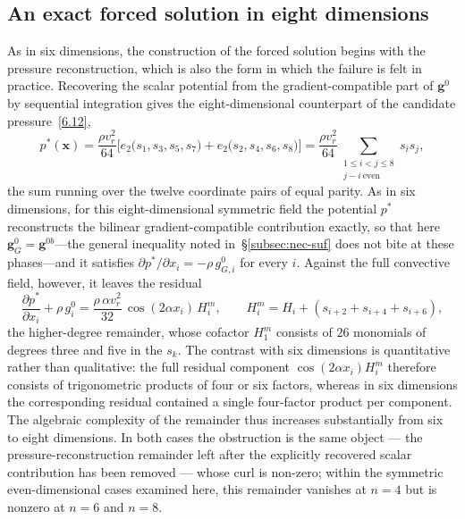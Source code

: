 \documentclass[11pt]{jfm}
\let\le=\leqslant  \let\leq=\leqslant
\numberwithin{equation}{section}
\begin{document}
\subsection{An exact forced solution in eight dimensions}
\label{subsec:8D-forced}
As in six dimensions, the construction of the forced solution begins with the pressure
reconstruction, which is also the form in which the failure is felt in practice. Recovering the scalar potential from the gradient-compatible
part of $\boldsymbol{g}^0$ by sequential integration gives the eight-dimensional counterpart of
the candidate pressure~\eqref{6.12},
\begin{equation}
\label{8.7}
p^{*}(\boldsymbol{x}) = \frac{\rho v_r^2}{64}
\Big[e_2\big(s_1,s_3,s_5,s_7\big)+e_2\big(s_2,s_4,s_6,s_8\big)\Big]
= \frac{\rho v_r^2}{64}\sum_{\substack{1\le i<j\le 8\\ j-i\ \text{even}}}^{\;} s_i s_j ,
\end{equation}
the sum running over the twelve coordinate pairs of equal parity. As in six dimensions, for this eight-dimensional symmetric field the potential $p^{*}$ reconstructs
the bilinear gradient-compatible contribution exactly, so that here
$\boldsymbol{g}^{0}_{G}=\boldsymbol{g}^{0b}$---the general inequality noted
in~\S\ref{subsec:nec-suf} does not bite at these phases---and it satisfies
$\partial p^{*}/\partial x_i = -\rho\,g^{0}_{G,i}$ for every $i$.
Against the full convective field, however, it leaves the residual
\begin{equation}
\label{8.8}
\frac{\partial p^{*}}{\partial x_i}+\rho\, g_i^0
=\frac{\rho\,\alpha v_r^2}{32}\,\cos(2\alpha x_i)\,H_i^{m},
\qquad
H_i^{m} = H_i + \left(s_{i+2}+s_{i+4}+s_{i+6}\right),
\end{equation}
the higher-degree remainder, whose cofactor $H_1^m$ consists of $26$ monomials of degrees three
and five
in the $s_k$. The contrast with six dimensions is quantitative rather than qualitative: the full residual component $\cos(2\alpha x_i)H_i^m$ therefore consists of trigonometric products
of four or six factors, whereas in six dimensions the corresponding residual contained a single
four-factor product per component. The algebraic complexity of the remainder thus increases
substantially from six to eight dimensions. In both cases the obstruction is
the same object --- the pressure-reconstruction remainder left after the explicitly recovered
scalar contribution has been removed --- whose curl is non-zero; within the symmetric even-dimensional cases
examined here, this remainder vanishes at $n=4$ but is nonzero at $n=6$ and $n=8$.
\end{document}
